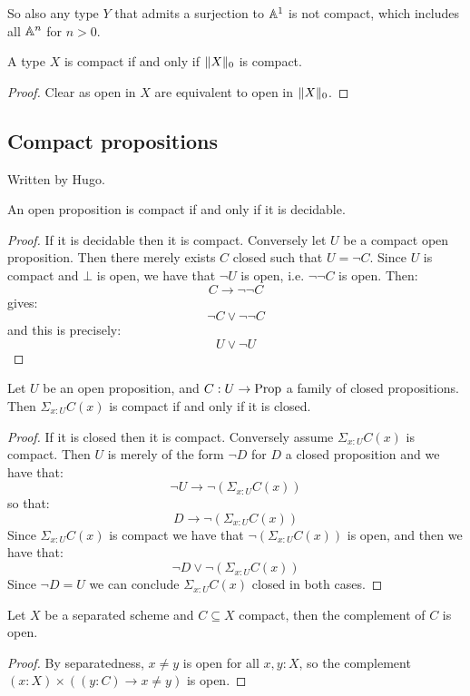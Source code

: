So also any type $Y$ that admits a surjection to $\mathbb{A}^1$ is not compact, which includes all $\mathbb{A}^n$ for $n>0$.

\begin{lemma}
A type $X$ is compact if and only if $\lVert X \rVert_0$ is compact.
\end{lemma}

\begin{proof}
Clear as open in $X$ are equivalent to open in $\lVert X \rVert_0$.
\end{proof}

\subsection{Compact propositions}

Written by Hugo.

\begin{lemma}
An open proposition is compact if and only if it is decidable.
\end{lemma}

\begin{proof}
If it is decidable then it is compact. Conversely let $U$ be a compact open proposition. Then there merely exists $C$ closed such that $U = \neg C$. Since $U$ is compact and $\bot$ is open, we have that $\neg U$ is open, i.e. $\neg\neg C$ is open. Then:
\[C\to \neg\neg C\]
gives:
\[\neg C \lor \neg\neg C\]
and this is precisely:
\[U \lor \neg U\] 
\end{proof}

\begin{lemma}\label{compact-proposition-scheme-are-closed}
Let $U$ be an open proposition, and $C:U\to \mathrm{Prop}$ a family of closed propositions. Then $\Sigma_{x:U}C(x)$ is compact if and only if it is closed.
\end{lemma}

\begin{proof}
If it is closed then it is compact. Conversely assume $\Sigma_{x:U}C(x)$ is compact. Then $U$ is merely of the form $\neg D$ for $D$ a closed proposition and we have that:
\[\neg U \to \neg(\Sigma_{x:U}C(x))\]
so that:
\[D\to \neg(\Sigma_{x:U}C(x))\]
Since $\Sigma_{x:U}C(x)$ is compact we have that $\neg(\Sigma_{x:U}C(x))$ is open, and then we have that:
\[\neg D \lor \neg(\Sigma_{x:U}C(x))\]
Since $\neg D = U$ we can conclude $\Sigma_{x:U}C(x)$ closed in both cases.
\end{proof}

\begin{lemma}
Let $X$ be a separated scheme and $C\subseteq X$ compact, then the complement of $C$ is open.
\end{lemma}

\begin{proof}
By separatedness, $x\neq y$ is open for all $x,y:X$, so the complement $(x:X)\times ((y:C)\to x\neq y)$ is open. 
\end{proof}
